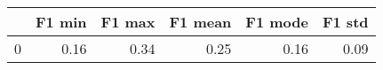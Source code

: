 \begin{tabular}{lrrrrr}
\toprule
{} &  F1 min &  F1 max &  F1 mean &  F1 mode &  F1 std \\
\midrule
0 &    0.16 &    0.34 &     0.25 &     0.16 &    0.09 \\
\bottomrule
\end{tabular}
